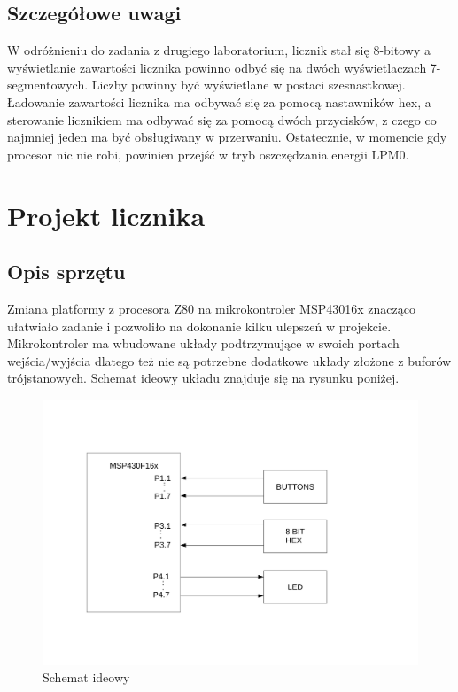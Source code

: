 \documentclass[a4paper,titlepage,11pt,floatssmall]{mwrep}
\begin{document}
\section{Szczegółowe uwagi}
\indent W odróżnieniu do zadania z drugiego laboratorium, licznik stał się 8-bitowy a wyświetlanie zawartości licznika powinno odbyć się na dwóch wyświetlaczach 7-segmentowych. Liczby powinny być wyświetlane w postaci szesnastkowej. Ładowanie zawartości licznika ma odbywać się za pomocą nastawników hex, a sterowanie licznikiem ma odbywać się za pomocą dwóch przycisków, z czego co najmniej jeden ma być obsługiwany w przerwaniu. Ostatecznie, w momencie gdy procesor nic nie robi, powinien przejść w tryb oszczędzania energii LPM0.

\chapter{Projekt licznika}

\section{Opis sprzętu}
\indent{} Zmiana platformy z procesora Z80 na mikrokontroler MSP43016x znacząco ułatwiało zadanie i pozwoliło na dokonanie kilku ulepszeń w projekcie. Mikrokontroler ma wbudowane układy podtrzymujące w swoich portach wejścia/wyjścia dlatego też nie są potrzebne dodatkowe układy złożone z buforów trójstanowych. Schemat ideowy układu znajduje się na rysunku poniżej.

\begin{figure}[th]
\centering
\includegraphics[width=\textwidth]{ideowy}
\caption{Schemat ideowy}
\end{figure}
\end{document}
